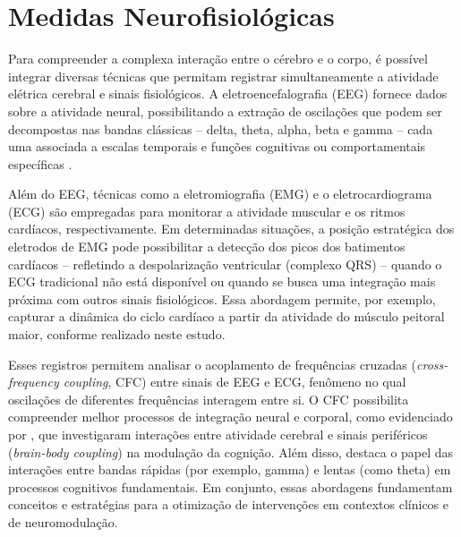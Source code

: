 \section{Medidas Neurofisiológicas}
Para compreender a complexa interação entre o cérebro e o corpo, é possível integrar diversas técnicas que permitam registrar simultaneamente a atividade elétrica cerebral e sinais fisiológicos. A eletroencefalografia (EEG) fornece dados sobre a atividade neural, possibilitando a extração de oscilações que podem ser decompostas nas bandas clássicas – delta, theta, alpha, beta e gamma – cada uma associada a escalas temporais e funções cognitivas ou comportamentais específicas \cite{cohen2017where, bullmore2009complex}.

Além do EEG, técnicas como a eletromiografia (EMG) e o eletrocardiograma (ECG) são empregadas para monitorar a atividade muscular e os ritmos cardíacos, respectivamente. Em determinadas situações, a posição estratégica dos eletrodos de EMG pode possibilitar a detecção dos picos dos batimentos cardíacos – refletindo a despolarização ventricular (complexo QRS) – quando o ECG tradicional não está disponível ou quando se busca uma integração mais próxima com outros sinais fisiológicos. Essa abordagem permite, por exemplo, capturar a dinâmica do ciclo cardíaco a partir da atividade do músculo peitoral maior, conforme realizado neste estudo.

Esses registros permitem analisar o acoplamento de frequências cruzadas (\textit{cross-frequency coupling}, CFC) entre sinais de EEG e ECG, fenômeno no qual oscilações de diferentes frequências interagem entre si. O CFC possibilita compreender melhor processos de integração neural e corporal, como evidenciado por , que investigaram interações entre atividade cerebral e sinais periféricos (\textit{brain-body coupling}) na modulação da cognição. Além disso,  destaca o papel das interações entre bandas rápidas (por exemplo, gamma) e lentas (como theta) em processos cognitivos fundamentais. Em conjunto, essas abordagens fundamentam conceitos e estratégias para a otimização de intervenções em contextos clínicos e de neuromodulação.